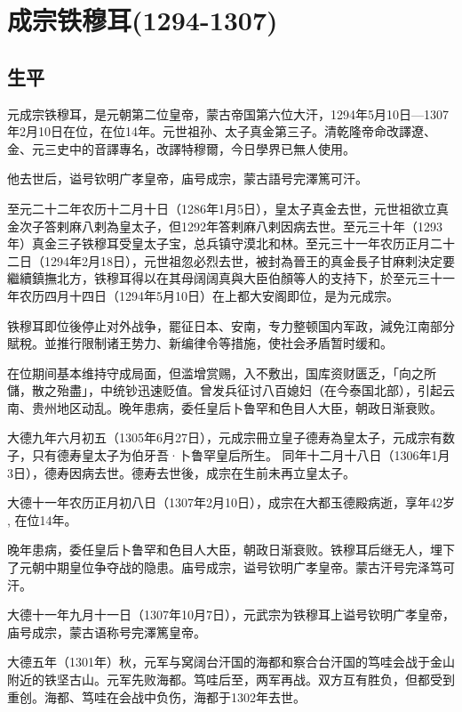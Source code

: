 
\section{成宗铁穆耳\tiny(1294-1307)}

\subsection{生平}

元成宗铁穆耳，是元朝第二位皇帝，蒙古帝国第六位大汗，1294年5月10日—1307年2月10日在位，在位14年。元世祖孙、太子真金第三子。清乾隆帝命改譯遼、金、元三史中的音譯專名，改譯特穆爾，今日學界已無人使用。

他去世后，谥号钦明广孝皇帝，庙号成宗，蒙古語号完澤篤可汗。

至元二十二年农历十二月十日（1286年1月5日），皇太子真金去世，元世祖欲立真金次子答剌麻八剌為皇太子，但1292年答剌麻八剌因病去世。至元三十年（1293年）真金三子铁穆耳受皇太子宝，总兵镇守漠北和林。至元三十一年农历正月二十二日（1294年2月18日），元世祖忽必烈去世，被封為晉王的真金長子甘麻剌決定要繼續鎮撫北方，铁穆耳得以在其母阔阔真與大臣伯顏等人的支持下，於至元三十一年农历四月十四日（1294年5月10日）在上都大安阁即位，是为元成宗。

铁穆耳即位後停止对外战争，罷征日本、安南，专力整顿国内军政，減免江南部分賦稅。並推行限制诸王势力、新编律令等措施，使社会矛盾暂时缓和。

在位期间基本维持守成局面，但滥增赏赐，入不敷出，国库资财匮乏，「向之所儲，散之殆盡」，中统钞迅速贬值。曾发兵征讨八百媳妇（在今泰国北部），引起云南、贵州地区动乱。晚年患病，委任皇后卜鲁罕和色目人大臣，朝政日渐衰败。

大德九年六月初五（1305年6月27日），元成宗冊立皇子德寿為皇太子，元成宗有数子，只有德寿皇太子为伯牙吾·卜鲁罕皇后所生。 同年十二月十八日（1306年1月3日），德寿因病去世。德寿去世後，成宗在生前未再立皇太子。

大德十一年农历正月初八日（1307年2月10日），成宗在大都玉德殿病逝，享年42岁 , 在位14年。

晚年患病，委任皇后卜鲁罕和色目人大臣，朝政日渐衰败。铁穆耳后继无人，埋下了元朝中期皇位争夺战的隐患。庙号成宗，谥号钦明广孝皇帝。蒙古汗号完泽笃可汗。

大德十一年九月十一日（1307年10月7日），元武宗为铁穆耳上谥号钦明广孝皇帝，庙号成宗，蒙古语称号完澤篤皇帝。

大德五年（1301年）秋，元军与窝阔台汗国的海都和察合台汗国的笃哇会战于金山附近的铁坚古山。元军先败海都。笃哇后至，两军再战。双方互有胜负，但都受到重创。海都、笃哇在会战中负伤，海都于1302年去世。

